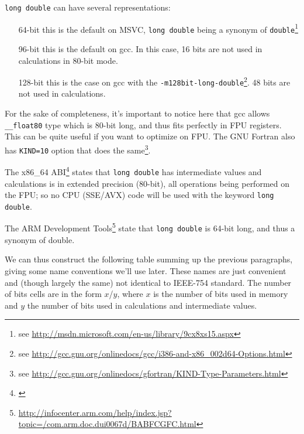
\texttt{long double} can have several representations:
\begin{enumerate}
\item[64-bit] this is the default on MSVC, \texttt{long double} being a synonym of \texttt{double}\footnote{see \url{http://msdn.microsoft.com/en-us/library/9cx8xs15.aspx}}
\item[96-bit] this is the default on gcc. In this case, 16 bits are not used in calculations in 80-bit mode.
\item[128-bit] this is the case on gcc with the \texttt{-m128bit-long-double}\footnote{see \url{http://gcc.gnu.org/onlinedocs/gcc/i386-and-x86\_002d64-Options.html}}. 48 bits are not used in calculations.
\end{enumerate}

For the sake of completeness, it's important to notice here that gcc allows \texttt{\_\_float80} type which is 80-bit long, and thus fits perfectly in FPU registers. This can be quite useful if you want to optimize on FPU. The GNU Fortran also has \texttt{KIND=10} option that does the same\footnote{see \url{http://gcc.gnu.org/onlinedocs/gfortran/KIND-Type-Parameters.html}}.


The x86\_64 ABI\footnote{\url{}} states that \texttt{long double} has intermediate values and calculations is in extended precision (80-bit), all operations being performed on the FPU; so no CPU (SSE/AVX) code will be used with the keyword \texttt{long double}.

The ARM Development Tools\footnote{\url{http://infocenter.arm.com/help/index.jsp?topic=/com.arm.doc.dui0067d/BABFCGFC.html}} state that \texttt{long double} is 64-bit long, and thus a synonym of double.


We can thus construct the following table summing up the previous paragraphs, giving some name conventions we'll use later. These names are just convenient and (though largely the same) not identical to IEEE-754 standard. The number of bits cells are in the form $x$/$y$, where $x$ is the number of bits used in memory and $y$ the number of bits used in calculations and intermediate values.


